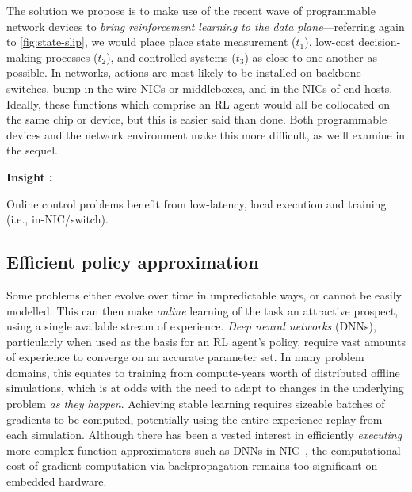 \documentclass[sigconf,natbib=false]{acmart}
\newcounter{insightc}
\newenvironment{insight}
	{
		\begin{tipblock}\refstepcounter{insightc}\textbf{Insight \theinsightc:}\em
	}
	{
		\end{tipblock}
	}
\begin{document}

The solution we propose is to make use of the recent wave of programmable network devices to \emph{bring reinforcement learning to the data plane}---referring again to \cref{fig:state-slip}, we would place place state measurement ($t_1$), low-cost decision-making processes ($t_2$), and controlled systems ($t_3$) as close to one another as possible.
In networks, actions are most likely to be installed on backbone switches, bump-in-the-wire NICs or middleboxes, and in the NICs of end-hosts.
Ideally, these functions which comprise an RL agent would all be collocated on the same chip or device, but this is easier said than done. 
Both programmable devices and the network environment make this more difficult, as we'll examine in the sequel.

\begin{insight}
	Online control problems benefit from low-latency, local execution and training (i.e., in-NIC/switch).
\end{insight}

\subsection{Efficient policy approximation}
Some problems either evolve over time in unpredictable ways, or cannot be easily modelled.
This can then make \emph{online} learning of the task an attractive prospect, using a single available stream of experience.
\emph{Deep neural networks} (DNNs), particularly when used as the basis for an RL agent's policy, require vast amounts of experience to converge on an accurate parameter set.
In many problem domains, this equates to training from compute-years worth of distributed offline simulations, which is at odds with the need to adapt to changes in the underlying problem \emph{as they happen}.
Achieving stable learning requires sizeable batches of gradients to be computed, potentially using the entire experience replay from each simulation.
Although there has been a vested interest in efficiently \emph{executing} more complex function approximators such as DNNs in-NIC~\parencite{DBLP:journals/corr/abs-2002-08987,DBLP:journals/corr/abs-2009-02353,DBLP:conf/sigcomm/SanvitoSB18,DBLP:journals/corr/abs-1801-05731,langlet-ml-netronome}, the computational cost of gradient computation via backpropagation remains too significant on embedded hardware.

\end{document}
